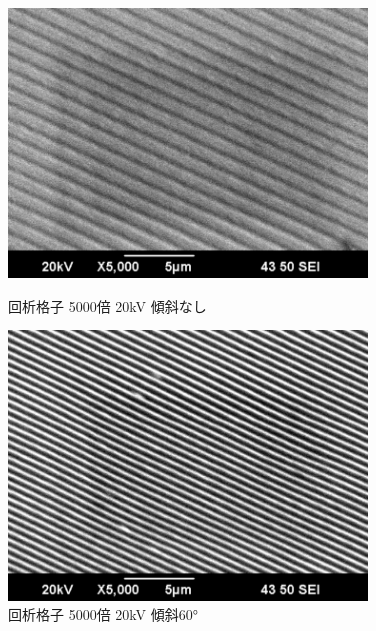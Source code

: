 \documentclass[a4paper,11pt]{jsarticle}
\begin{document}
\begin{figure}[H]
  \begin{minipage}{0.5\hsize}
    \begin{center}
      \includegraphics[width=0.85\textwidth]{figs/0523/kaisetukousi/5000_20kV.pdf}
    \end{center}
    \caption{回析格子 5000倍 20kV 傾斜なし}
  \end{minipage}
  \begin{minipage}{0.5\hsize}
    \begin{center}
      \includegraphics[width=0.85\textwidth]{figs/0523/kaisetukousi/5000_20kV_60.pdf}
    \end{center}
    \caption{回析格子 5000倍 20kV 傾斜60°}
  \end{minipage}
\end{figure}
\end{document}
